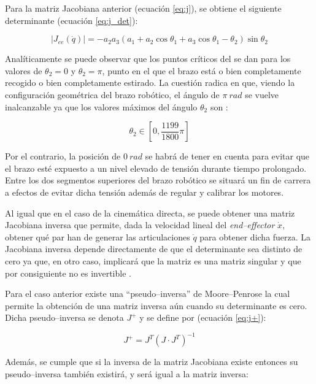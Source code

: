 Para la matriz Jacobiana anterior (ecuación \ref{eq:j}), se obtiene el siguiente
determinante (ecuación \ref{eq:j_det}):

\begin{equation}\label{eq:j_det}
    \left|J_{ee}\left(\dot{q}\right)\right| = - a_{2} a_{3} \left(a_{1} + a_{2} \cos{\theta_{1}} + a_{3} \cos{\theta_{1} - \theta_{2}}\right) \sin{\theta_{2}}
\end{equation}

Analíticamente se puede observar que los puntos críticos del \pArm{} se dan para
los valores de $\theta_2 = 0$ y $\theta_2 = \pi$, punto en el que el brazo está o bien
completamente recogido o bien completamente estirado. La cuestión radica en que, viendo
la configuración geométrica del brazo robótico, el ángulo de $\pi~rad$ se
vuelve inalcanzable ya que los valores máximos del ángulo $\theta_2$ son \cite{ufactoryUArmDeveloperSwiftProForArduino}:

\begin{equation*}
    \theta_2 \in \left[0, \frac{1199}{1800}\pi\right]
\end{equation*}

Por el contrario, la posición de $0~rad$ se habrá de tener en cuenta para
evitar que el brazo esté expuesto a un nivel elevado de tensión durante tiempo prolongado.
Entre los dos segmentos superiores del brazo robótico se situará un fin de carrera a
efectos de evitar dicha tensión además de regular y calibrar los motores.

Al igual que en el caso de la cinemática directa, se puede obtener una matriz Jacobiana
inversa que permite, dada la velocidad lineal del \textit{end--effector} $\dot{x}$, obtener qué par han
de generar las articulaciones $\dot{q}$ para obtener dicha fuerza. La Jacobiana inversa
depende directamente de que el determinante sea distinto de cero ya que, en otro caso,
implicará que la matriz es una matriz singular y que por consiguiente no es invertible
\cite{InvertibleMatrix2020}.

Para el caso anterior existe una ``pseudo--inversa'' de Moore--Penrose \cite{PseudoinversaMoorePenrose2020}
la cual permite la obtención de una matriz inversa aún cuando su determinante es cero.
Dicha pseudo--inversa se denota $J^+$ y se define por (ecuación \ref{eq:j+}):

\begin{equation}\label{eq:j+}
    J^+ = J^T (J \cdot J^T)^{-1}
\end{equation}

Además, se cumple que si la inversa de la matriz Jacobiana existe entonces su pseudo--inversa
también existirá, y será igual a la matriz inversa:

